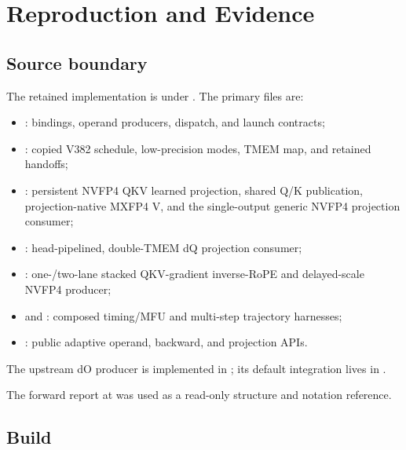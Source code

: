 \section{Reproduction and Evidence}
\label{app:reproduction}

\subsection{Source boundary}

The retained implementation is under
.  The primary files are:

\begin{itemize}
  \item {}: bindings, operand producers, dispatch, and
  launch contracts;
  \item {}: copied V382 schedule,
  low-precision modes, TMEM map, and retained handoffs;
  \item {}: persistent NVFP4 QKV learned
  projection, shared Q/K publication, projection-native MXFP4 V, and the
  single-output generic NVFP4 projection consumer;
  \item {}: head-pipelined, double-TMEM dQ
  projection consumer;
  \item {}: one-/two-lane stacked
  QKV-gradient inverse-RoPE and delayed-scale NVFP4 producer;
  \item {} and
  : composed timing/MFU and
  multi-step trajectory harnesses;
  \item {}: public adaptive operand, backward, and projection
  APIs.
\end{itemize}

The upstream dO producer is implemented in
; its default integration lives
in .

The forward report at
 was used as a read-only
structure and notation reference.

\subsection{Build}

